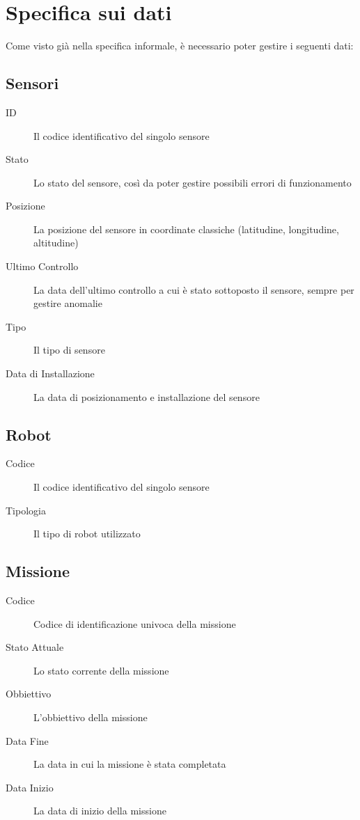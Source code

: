 \section{Specifica sui dati}
Come visto già nella specifica informale, è necessario poter gestire i seguenti dati:
\subsection{Sensori}
\begin{description}
\item[ID] Il codice identificativo del singolo sensore
\item[Stato] Lo stato del sensore, così da poter gestire possibili
  errori di funzionamento
\item[Posizione] La posizione del sensore in coordinate classiche
  (latitudine, longitudine, altitudine)
\item[Ultimo Controllo] La data dell'ultimo controllo a cui è stato
  sottoposto il sensore, sempre per gestire anomalie
\item[Tipo] Il tipo di sensore
\item[Data di Installazione] La data di posizionamento e installazione
  del sensore
\end{description}
\subsection{Robot}
\begin{description}
\item[Codice] Il codice identificativo del singolo sensore
\item[Tipologia] Il tipo di robot utilizzato
\end{description}
\subsection{Missione}
\begin{description}
\item[Codice] Codice di identificazione univoca della missione
\item[Stato Attuale] Lo stato corrente della missione
\item[Obbiettivo] L'obbiettivo della missione
\item[Data Fine] La data in cui la missione è stata completata
\item[Data Inizio] La data di inizio della missione
\end{description}
